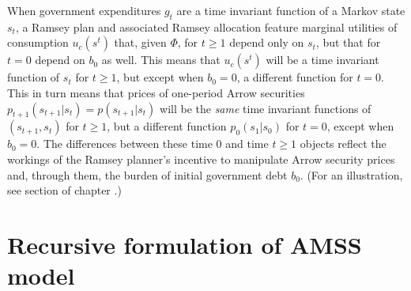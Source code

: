 When  government expenditures  $g_t$ are  a time invariant function of a Markov state $s_t$, a Ramsey plan and associated Ramsey allocation
feature marginal utilities of consumption  $u_c(s^t)$
that, given $\Phi$, for $t \geq 1$  depend only on $s_t$, but that for $t=0$ depend on $b_0$ as well.  This means that $u_c(s^t)$ will be a time invariant
function of $s_t$ for $ t\geq 1$, but except when $b_0 = 0$, a different function for $t=0$.  This in turn means that prices of one-period Arrow securities
$p_{t+1}(s_{t+1} | s_t) = p(s_{t+1}|s_t)$ will be the {\it same\/} time invariant functions of $(s_{t+1}, s_t)$ for $t \geq 1$, but a different function $p_0(s_1|s_0)$
for $t=0$, except when $b_0=0$.  The differences between these time $0$ and time $t \geq 1$ objects reflect the workings of the Ramsey planner's incentive
to manipulate Arrow security prices and, through them, the burden of initial government debt $b_0$. (For an illustration, see
section  of chapter .)



%
%




\section{Recursive formulation of AMSS model}

